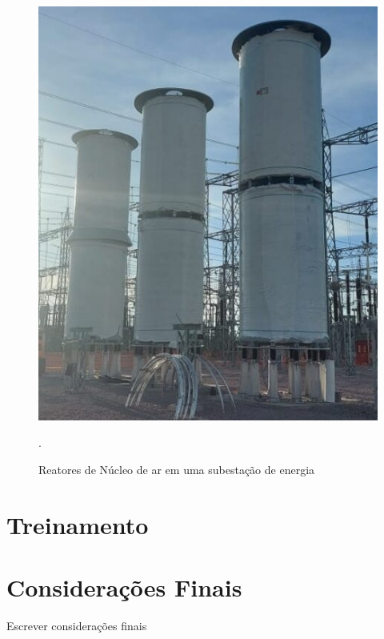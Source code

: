 \begin{figure}[!h]
    \centering
    \begin{minipage}{0.5\linewidth}
    \centering
    \captionsetup{justification=centering,margin=0.5cm,font=small}
    \includegraphics[width=0.7\linewidth]{img/cap2/reator-ar.jpeg}
    \caption{Reatores de Núcleo de ar em uma subestação de energia \cite{reatorNucleoDeAr}}.
    \label{fig:reator-marcado}
    \end{minipage}
\end{figure}


\section{Treinamento}
\section{Considerações Finais}

Escrever considerações finais



